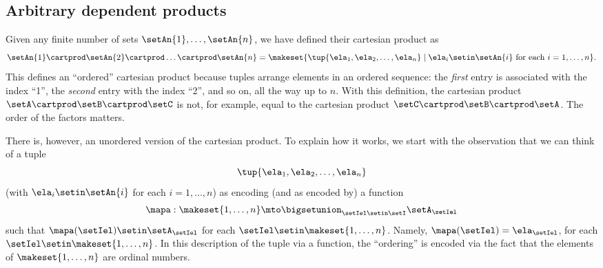 \subsection{Arbitrary dependent products}


Given any finite number of sets $\setAn{1}, \dots, \setAn{n}$, we have defined their cartesian product as
\begin{equation}
    \setAn{1} \cartprod \setAn{2} \cartprod \dots \cartprod \setAn{n} = \makeset{ \tup{\ela_{1}, \ela_{2}, \dots, \ela_{n}} \mid \ela_{i} \setin \setAn{i} \text{ for each } i = 1, \dots, n }.
\end{equation}
This defines an ``ordered'' cartesian product because tuples arrange elements in an ordered sequence: the \emph{first} entry is associated with the index ``1'', the \emph{second} entry with the index ``2'', and so on, all the way up to $n$.
With this definition, the cartesian product $\setA \cartprod \setB \cartprod \setC$ is not, for example, equal to the cartesian product $\setC \cartprod \setB \cartprod \setA$.
The order of the factors matters.

There is, however, an unordered version of the cartesian product.
To explain how it works, we start with the observation that we can think of a tuple
\begin{equation}
    \tup{\ela_{1}, \ela_{2}, \dots, \ela_{n}}
\end{equation}
(with $\ela_{i} \setin \setAn{i}$ for each $i = 1, \dots, n$) as encoding (and as encoded by) a function
\begin{equation}
    \mapa : \makeset{1, \dots, n} \mto \bigsetunion_{\setIel \setin\setI } \setA_{\setIel}
\end{equation}
such that $\mapa(\setIel) \setin\setA_{\setIel}$ for each $\setIel \setin \makeset{1, \dots, n}$.
Namely, $\mapa(\setIel) = \ela_\setIel$, for each $\setIel \setin \makeset{1, \dots, n}$.
In this description of the tuple via a function, the ``ordering'' is encoded via the fact that the elements of $\makeset{1, \dots, n}$ are ordinal numbers.


